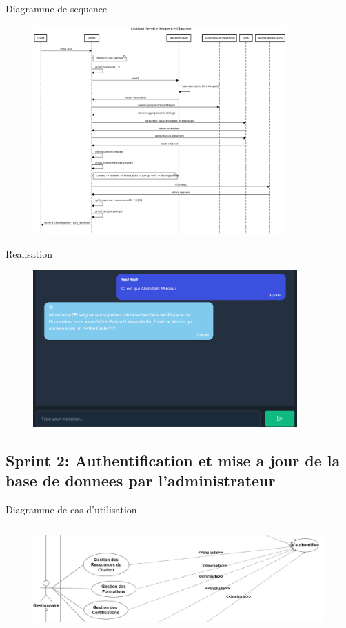 \documentclass[aspectratio=169]{beamer}
\begin{document}
\begin{frame}{Diagramme de sequence}
    \begin{figure}[htpb]
        \centering
        \includegraphics[height=8cm]{assets/images/chatbot-seq.png}
    \end{figure}
\end{frame}

\begin{frame}{Realisation}
    \begin{figure}[htpb]
        \centering
        \includegraphics[height=6cm]{assets/images/chat2.png}
    \end{figure}
\end{frame}


\subsection{Sprint 2: Authentification et mise a jour de la
    base de donnees par l’administrateur}
\begin{frame}{Diagramme de cas d'utilisation}

    \begin{figure}[htpb]
        \centering
        \includegraphics[height=4cm]{assets/images/sprint2-usecase.png}
    \end{figure}
\end{frame}
\end{document}

